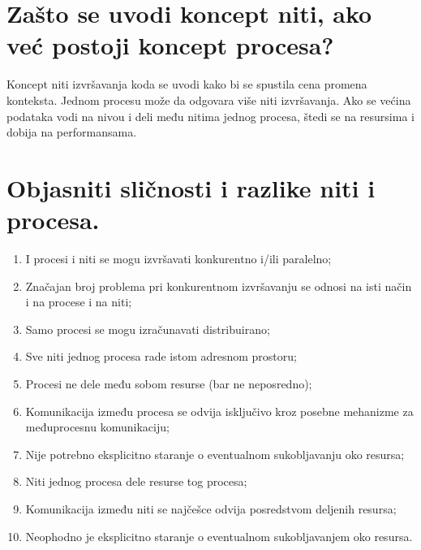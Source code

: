 \documentclass[a4paper]{article}
\begin{document}
\section{Zašto se uvodi koncept niti, ako već postoji koncept procesa?}
  Koncept niti izvršavanja koda se uvodi kako bi se spustila cena promena konteksta. 
  Jednom procesu može da odgovara više niti izvršavanja. Ako se većina podataka vodi na nivou i deli 
  među nitima jednog procesa, štedi se na resursima i dobija na performansama.

\section{Objasniti sličnosti i razlike niti i procesa.}
  \begin{enumerate}
    \item I procesi i niti se mogu izvršavati konkurentno i/ili paralelno;
    \item Značajan broj problema pri konkurentnom izvršavanju se odnosi na isti način 
          i na procese i na niti;
    \item Samo procesi se mogu izračunavati distribuirano;
    \item Sve niti jednog procesa rade istom adresnom prostoru;
    \item Procesi ne dele među sobom resurse (bar ne neposredno);
    \item Komunikacija između procesa se odvija isključivo kroz posebne mehanizme za 
          međuprocesnu komunikaciju;
    \item Nije potrebno eksplicitno staranje o eventualnom sukobljavanju oko resursa;
    \item Niti jednog procesa dele resurse tog procesa;
    \item Komunikacija između niti se najčešce odvija posredstvom deljenih resursa;
    \item Neophodno je eksplicitno staranje o eventualnom sukobljavanjem oko resursa.
  \end{enumerate}
  
\end{document}
